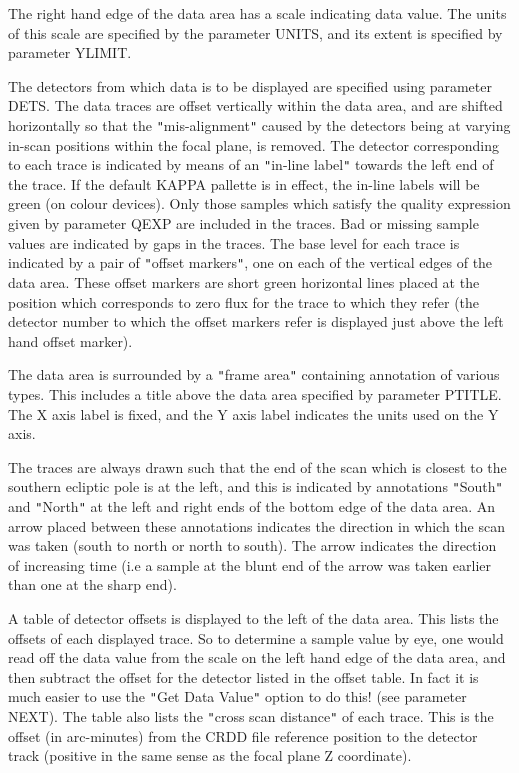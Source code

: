 \begin{small}
{{      The right hand edge of the data area has a scale indicating data
      value. The units of this scale are specified by the parameter
      UNITS, and its extent is specified by parameter YLIMIT.

      The detectors from which data is to be displayed are specified
      using parameter DETS. The data traces are offset vertically
      within the data area, and are shifted horizontally so that the
      {\tt "}mis-alignment{\tt "} caused by the detectors being at varying in-scan
      positions within the focal plane, is removed. The detector
      corresponding to each trace is indicated by means of an {\tt "}in-line
      label{\tt "} towards the left end of the trace. If the default KAPPA
      pallette is in effect, the in-line labels will be green (on
      colour devices). Only those samples which satisfy the quality
      expression given by parameter QEXP are included in the traces.
      Bad or missing sample values are indicated by gaps in the traces.
      The base level for each trace is indicated by a pair of {\tt "}offset
      markers{\tt "}, one on each of the vertical edges of the data area.
      These offset markers are short green horizontal lines placed at
      the position which corresponds to zero flux for the trace to
      which they refer (the detector number to which the offset markers
      refer is displayed just above the left hand offset marker).

      The data area is surrounded by a {\tt "}frame area{\tt "} containing
      annotation of various types. This includes a title above the data
      area specified by parameter PTITLE. The X axis label is fixed, and
      the Y axis label indicates the units used on the Y axis.

      The traces are always drawn such that the end of the scan which is
      closest to the southern ecliptic pole is at the left, and this is
      indicated by annotations {\tt "}South{\tt "} and {\tt "}North{\tt "} at the left and right
      ends of the bottom edge of the data area. An arrow placed between
      these annotations indicates the direction in which the scan was
      taken (south to north or north to south). The arrow indicates the
      direction of increasing time (i.e a sample at the blunt end of
      the arrow was taken earlier than one at the sharp end).

      A table of detector offsets is displayed to the left of the data
      area. This lists the offsets of each displayed trace. So to
      determine a sample value by eye, one would read off the data value
      from the scale on the left hand edge of the data area, and then
      subtract the offset for the detector listed in the offset table.
      In fact it is much easier to use the {\tt "}Get Data Value{\tt "} option to do
      this! (see parameter NEXT). The table also lists the {\tt "}cross scan
      distance{\tt "} of each trace. This is the offset (in arc-minutes) from
      the CRDD file reference position to the detector track (positive
      in the same sense as the focal plane Z coordinate).

}}
\end{small}
